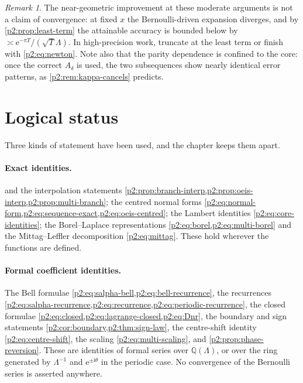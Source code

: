 \documentclass[11pt,a4paper,oneside]{book}
\theoremstyle{plain}
\theoremstyle{definition}
\theoremstyle{remark}
\newtheorem{remark}[theorem]{Remark}
\newcommand{\Rat}{\mathbb{Q}}
\newcommand{\e}{\mathrm{e}}
\newcommand{\ii}{\mathrm{i}}
\begin{document}
\begin{remark}
The near-geometric improvement at these moderate arguments is not a claim of
convergence: at fixed \(x\) the Bernoulli-driven expansion diverges, and by
\cref{p2:prop:least-term} the attainable accuracy is bounded below by
\(\asymp\e^{-\pi T}/(\sqrt T\Lambda)\).  In high-precision work, truncate at
the least term or finish with \cref{p2:eq:newton}.  Note also that the
parity dependence is confined to the core: once the correct \(A_\delta\) is
used, the two subsequences show nearly identical error patterns, as
\cref{p2:rem:kappa-cancels} predicts.
\end{remark}

\section{Logical status}
\label{p2:sec:status}

Three kinds of statement have been used, and the chapter keeps them apart.

\paragraph{Exact identities.}
 and the interpolation
statements \cref{p2:prop:branch-interp,p2:prop:oeis-interp,p2:prop:multi-branch};
the centred normal forms \cref{p2:eq:normal-form,p2:eq:sequence-exact,p2:eq:oeis-centred};
the Lambert identities \cref{p2:eq:core-identities}; the Borel--Laplace
representations \cref{p2:eq:borel,p2:eq:multi-borel} and the Mittag--Leffler
decomposition \cref{p2:eq:mittag}.  These hold wherever the functions are
defined.

\paragraph{Formal coefficient identities.}
The Bell formulae \cref{p2:eq:salpha-bell,p2:eq:bell-recurrence}, the
recurrences \cref{p2:eq:salpha-recurrence,p2:eq:recurrence,p2:eq:periodic-recurrence},
the closed formulae \cref{p2:eq:closed,p2:eq:lagrange-closed,p2:eq:Dnr}, the
boundary and sign statements \cref{p2:cor:boundary,p2:thm:sign-law}, the
centre-shift identity \cref{p2:eq:centre-shift}, the scaling
\cref{p2:eq:multi-scaling}, and \cref{p2:prop:phase-reversion}.  These are
identities of formal series over \(\Rat(\Lambda)\), or over the ring generated
by \(\Lambda^{-1}\) and \(\e^{\pm\ii\theta}\) in the periodic case.  No
convergence of the Bernoulli series is asserted anywhere.
\end{document}
